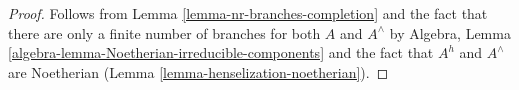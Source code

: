 \documentclass[10pt,a4paper]{amsart}
\theoremstyle{plain}
\theoremstyle{definition}
\theoremstyle{remark}
\numberwithin{equation}{subsection}
\begin{document}
\begin{proof}
Follows from Lemma \ref{lemma-nr-branches-completion}
and the fact that there are only a finite number of branches
for both $A$ and $A^\wedge$ by
Algebra, Lemma \ref{algebra-lemma-Noetherian-irreducible-components}
and the fact that $A^h$ and $A^\wedge$ are Noetherian
(Lemma \ref{lemma-henselization-noetherian}).
\end{proof}
\end{document}

